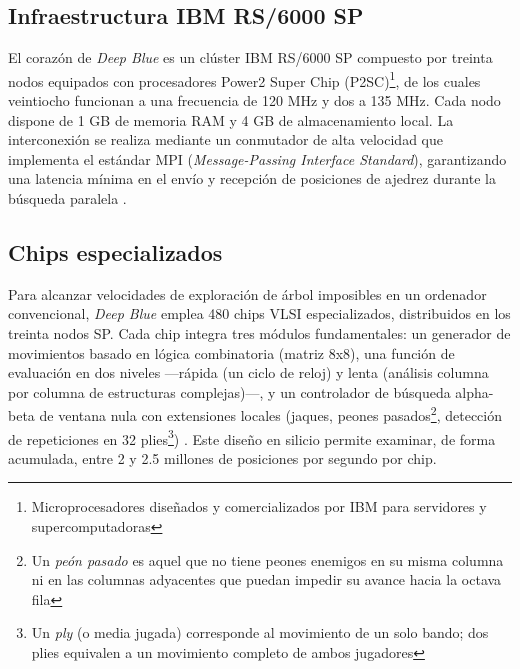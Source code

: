 \documentclass[a4paper, 12pt]{article}
\begin{document}
\subsection{Infraestructura IBM RS/6000 SP}

El corazón de \textit{Deep Blue} es un clúster IBM RS/6000 SP 
compuesto por treinta nodos equipados con procesadores Power2 
Super Chip (P2SC)\footnote{Microprocesadores diseñados y comercializados por IBM para servidores y supercomputadoras}, 
de los cuales veintiocho funcionan a una 
frecuencia de 120 MHz y dos a 135 MHz. Cada nodo dispone de 1 GB 
de memoria RAM y 4 GB de almacenamiento local. La interconexión 
se realiza mediante un conmutador de alta velocidad que 
implementa el estándar MPI (\emph{Message-Passing Interface Standard}), garantizando una latencia mínima en 
el envío y recepción de posiciones de ajedrez durante la 
búsqueda paralela \cite{campbell2002deep, hsu1999ibm}.

\subsection{Chips especializados}

Para alcanzar velocidades de exploración de árbol imposibles en 
un ordenador convencional, \textit{Deep Blue} emplea 480 chips 
VLSI especializados, distribuidos en los treinta nodos SP. Cada 
chip integra tres módulos fundamentales: un generador de 
movimientos basado en lógica combinatoria (matriz 8x8), una 
función de evaluación en dos niveles —rápida (un ciclo de reloj) 
y lenta (análisis columna por columna de estructuras complejas)—, 
y un controlador de búsqueda alpha-beta de ventana nula con 
extensiones locales (jaques, peones pasados\footnote{Un \emph{peón pasado} 
es aquel que no tiene peones enemigos en su misma columna ni en 
las columnas adyacentes que puedan impedir su avance hacia la 
octava fila}, detección de 
repeticiones en 32 plies\footnote{Un \emph{ply} (o media jugada) 
corresponde al movimiento de un solo bando; dos plies equivalen 
a un movimiento completo de ambos jugadores}) \cite{campbell2002deep}. Este diseño en 
silicio permite examinar, de forma acumulada, entre 2 y 2.5 
millones de posiciones por segundo por chip. \cite{hsu1999ibm}
\end{document}

